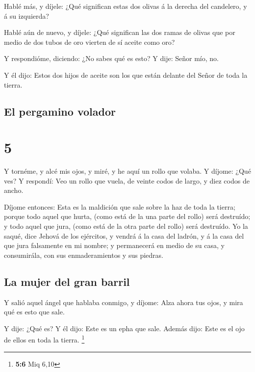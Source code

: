  Hablé más, y díjele: ¿Qué significan estas dos olivas á
la derecha del candelero, y á su izquierda?

 Hablé aún de nuevo, y díjele: ¿Qué significan las dos
ramas de olivas que por medio de dos tubos de oro vierten de sí aceite
como oro?

 Y respondióme, diciendo: ¿No sabes qué es esto? Y dije:
Señor mío, no.

 Y él dijo: Estos dos hijos de aceite son los que están
delante del Señor de toda la tierra.

\hypertarget{el-pergamino-volador}{%
\subsection{El pergamino volador}\label{el-pergamino-volador}}

\hypertarget{section-4}{%
\section{5}\label{section-4}}

 Y tornéme, y alcé mis ojos, y miré, y he aquí un rollo
que volaba.  Y díjome: ¿Qué ves? Y respondí: Veo un rollo
que vuela, de veinte codos de largo, y diez codos de ancho.

 Díjome entonces: Esta es la maldición que sale sobre la
haz de toda la tierra; porque todo aquel que hurta, (como está de la una
parte del rollo) será destruído; y todo aquel que jura, (como está de la
otra parte del rollo) será destruído.  Yo la saqué, dice
Jehová de los ejércitos, y vendrá á la casa del ladrón, y á la casa del
que jura falsamente en mi nombre; y permanecerá en medio de su casa, y
consumirála, con sus enmaderamientos y sus piedras.

\hypertarget{la-mujer-del-gran-barril}{%
\subsection{La mujer del gran barril}\label{la-mujer-del-gran-barril}}

 Y salió aquel ángel que hablaba conmigo, y díjome: Alza
ahora tus ojos, y mira qué es esto que sale.

 Y dije: ¿Qué es? Y él dijo: Este es un epha que sale.
Además dijo: Este es el ojo de ellos en toda la tierra. \footnote{\textbf{5:6}
  Miq 6,10}

